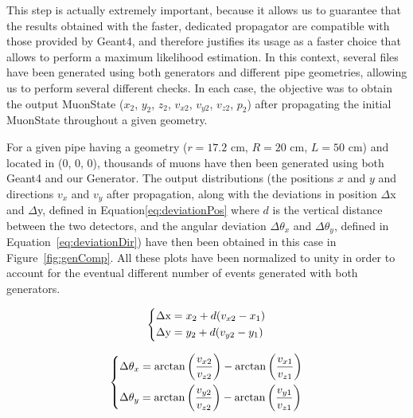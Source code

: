 \documentclass[a4paper, 11pt, twoside, openright]{report}
\begin{document}
This step is actually extremely important, because it allows us to guarantee that the results obtained with the faster, dedicated propagator are compatible with those provided by Geant4, and therefore justifies its usage as a faster choice that allows to perform a maximum likelihood estimation. In this context, several files have been generated using both generators and different pipe geometries, allowing us to perform several different checks. In each case, the objective was to obtain the output MuonState ($x_2$, $y_2$, $z_2$, $v_{x2}$, $v_{y2}$, $v_{z2}$, $p_2$) after propagating the initial MuonState throughout a given geometry.

For a given pipe having a geometry ($r = 17.2$ cm, $R = 20$ cm, $L = 50$ cm) and located in (0, 0, 0), thousands of muons have then been generated using both Geant4 and our Generator. The output distributions (the positions $x$ and $y$ and directions $v_x$ and $v_y$ after propagation, along with the deviations in position $\Delta$x and $\Delta$y, defined in Equation\ref{eq:deviationPos} where $d$ is the vertical distance between the two detectors, and the angular deviation $\Delta \theta_x$ and $\Delta \theta_y$, defined in Equation~\ref{eq:deviationDir}) have then been obtained in this case in Figure~\ref{fig:genComp}. All these plots have been normalized to unity in order to account for the eventual different number of events generated with both generators.

\begin{equation}
\label{eq:deviationPos}
\begin{dcases}
\Delta \text{x} = x_2 + d (v_{x2} - x_1)  \\
\Delta \text{y} = y_2 + d (v_{y2} - y_1)
\end{dcases}
\end{equation}

\begin{equation}
\label{eq:deviationDir}
\begin{dcases}
\Delta \theta_x = \arctan \left ({\frac{v_{x2}}{v_{z2}}} \right ) - \arctan \left ({\frac{v_{x1}}{v_{z1}}} \right ) \\
\Delta \theta_y = \arctan \left ({\frac{v_{y2}}{v_{z2}}} \right ) - \arctan \left ({\frac{v_{y1}}{v_{z1}}} \right )
\end{dcases}
\end{equation}
\end{document}
